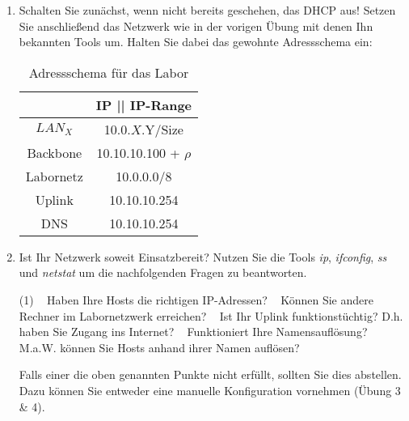 \documentclass[paper=a4,fontsize=11pt]{scrartcl}%
\numberwithin{equation}{section}
\begin{document}
\begin{enumerate}
	\item Schalten Sie zunächst, wenn nicht bereits geschehen, das DHCP aus! Setzen Sie anschließend das Netzwerk wie in der vorigen Übung mit denen Ihn bekannten Tools um. Halten Sie dabei das gewohnte Adressschema ein:
\begin{table}[H]
\caption{Adressschema für das Labor}
\label{adress_scheme}
\centering
\begin{tabular}{|c|c|}\hline
 & \textbf{IP  || IP-Range} \\ \hline
 $LAN_X$ & 10.0.$X$.Y/Size \\ \hline
 Backbone & 10.10.10.100 + $\rho$ \\ \hline
 Labornetz & 10.0.0.0/8 \\ \hline
 Uplink & 10.10.10.254 \\ \hline
 DNS & 10.10.10.254 \\ \hline
\end{tabular}
\end{table}  
	\item Ist Ihr Netzwerk soweit Einsatzbereit? Nutzen Sie die Tools \emph{ip}, \emph{ifconfig}, \emph{ss} und \emph{netstat} um die nachfolgenden Fragen zu beantworten.
	\begin{tasks}(1)
		\task~ Haben Ihre Hosts die richtigen IP-Adressen?
		\task~ Können Sie andere Rechner im Labornetzwerk erreichen?
		\task~ Ist Ihr Uplink funktionstüchtig? D.h. haben Sie Zugang ins Internet?
		\task~ Funktioniert Ihre Namensauflösung? M.a.W. können Sie Hosts anhand ihrer Namen auflösen?
	\end{tasks}
	Falls einer die oben genannten Punkte nicht erfüllt, sollten Sie dies abstellen. Dazu können Sie entweder eine manuelle Konfiguration vornehmen (Übung 3 \& 4).
\end{enumerate}
	
\end{document}
